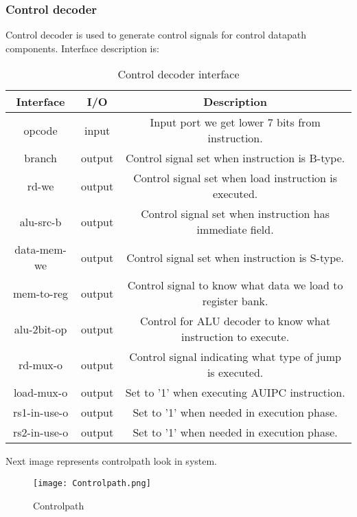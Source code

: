 \documentclass{scrreprt}
\begin{document}
    \subsubsection*{Control decoder}
        Control decoder is used to generate control signals for control datapath components. Interface description is:
         \begin{table}[htb!]
        \centering
        \begin{tabular}{|c|c|c|} \hline 
             Interface & I/O & Description \\ \hline  
             opcode & input & Input port we get lower 7 bits from instruction. \\ \hline  
             branch & output & Control signal set when instruction is B-type.  \\ \hline
             rd-we & output & Control signal set when load instruction is executed. \\ \hline
             alu-src-b & output & Control signal set when instruction has immediate field.  \\ \hline
             data-mem-we & output & Control signal set when instruction is S-type.  \\ \hline
             mem-to-reg & output & Control signal to know what data we load to register bank.\\ \hline
             alu-2bit-op & output & Control for ALU decoder to know what instruction to execute. \\\hline
             rd-mux-o & output & Control signal indicating what type of jump is executed.  \\ \hline
             load-mux-o & output & Set to '1' when executing AUIPC instruction.  \\ \hline
             rs1-in-use-o & output & Set to '1' when needed in execution phase.\\ \hline
             rs2-in-use-o & output & Set to '1' when needed in execution phase.\\ \hline
        \end{tabular}
        \caption{Control decoder interface}
        \label{tab:Controldecoder}
    \end{table}
Next image represents controlpath look in system. 

\begin{figure}[htb!]
    \centering
    \texttt{[image: Controlpath.png]}
    \caption{Controlpath}
    \label{fig:Controlpath}
\end{figure}
\hfill \break 
{}
\end{document}

